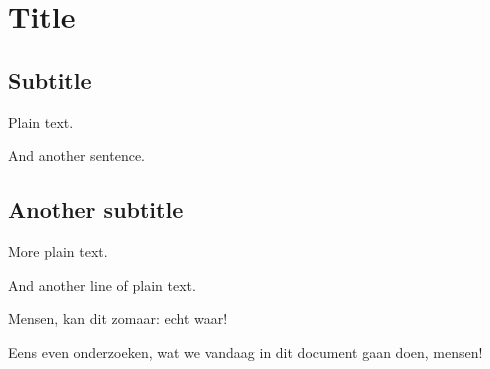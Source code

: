 \documentclass{book}
\begin{document}
\section{Title}


\subsection{Subtitle}

Plain text.

And another sentence.

\subsection{Another subtitle}

More plain text.

And another line of plain text.

Mensen, kan dit zomaar: echt waar!

Eens even onderzoeken, wat we vandaag in dit document gaan doen, mensen!
\end{document}
